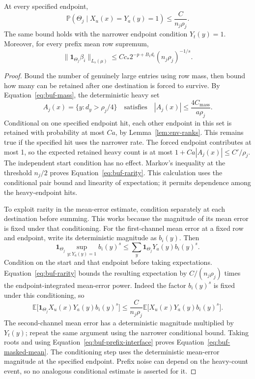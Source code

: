 \begin{lemma}
\label{lem:buf-rarity}
At every specified endpoint,
\begin{equation}
 \mathbb P(\Theta_j\mid X_u(x)=Y_a(y)=1)
      \leq\frac{C}{n_j\rho_j}.
 \label{eq:buf-rarity}
\end{equation}
The same bound holds with the narrower endpoint condition $Y_t(y)=1$.
Moreover, for every prefix mean row supremum,
\begin{equation}
 \|\mathbf1_{\Theta_j}\beta_i\|_{L_s(\mu)}
      \leq Cc_*2^{-p+B_1d_i}(n_j\rho_j)^{-1/s}.
 \label{eq:buf-masked-mean}
\end{equation}
\end{lemma}
\begin{proof}
Bound the number of genuinely large entries using row mass, then bound how many can be retained after one destination is forced to survive. By Equation~\eqref{eq:buf-mass}, the deterministic heavy set
\[
 A_j(x)=\{y:d_y>\rho_j/4\}
 \quad\text{satisfies}\quad
 |A_j(x)|\leq\frac{4C_{\mathrm{mass}}}{a\rho_j}.
\]
Conditional on one specified endpoint
hit, each other endpoint in this set is retained with probability at most
$Ca$, by Lemma~\ref{lem:env-ranks}.  This remains true if the
specified hit uses the narrower rate.  The forced endpoint contributes
at most 1, so the expected retained heavy count is at most
$1+Ca|A_j(x)|\leq C'/\rho_j$.
The independent start condition has no effect.  Markov's inequality
at the threshold $n_j/2$ proves Equation~\eqref{eq:buf-rarity}.
This calculation uses the conditional pair bound and linearity of
expectation; it permits dependence among the heavy-endpoint hits.

To exploit rarity in the mean-error estimate, condition separately at each destination before summing. This works because the magnitude of its mean error is fixed under that conditioning. For the first-channel mean error at a fixed row and endpoint, write its
deterministic magnitude as $b_i(y)$.  Then
\[
 \mathbf1_{\Theta_j}\sup_{y:Y_a(y)=1}b_i(y)^s
       \leq\sum_y\mathbf1_{\Theta_j}Y_a(y)b_i(y)^s.
\]
Condition on the start and that endpoint before taking expectations.
Equation~\eqref{eq:buf-rarity} bounds the resulting expectation by
$C/(n_j\rho_j)$ times the endpoint-integrated mean-error power.
Indeed the factor $b_i(y)^s$ is fixed under this conditioning, so
\[
 \mathbb E\bigl[\mathbf1_{\Theta_j}X_u(x)Y_a(y)b_i(y)^s\bigr]
 \leq\frac{C}{n_j\rho_j}
       \mathbb E\bigl[X_u(x)Y_a(y)b_i(y)^s\bigr].
\]
The second-channel mean error has a deterministic magnitude multiplied
by $Y_t(y)$; repeat the same argument using the narrower conditional
bound.  Taking roots and using Equation~\eqref{eq:buf-prefix-interface}
proves Equation~\eqref{eq:buf-masked-mean}.  The conditioning step uses
the deterministic mean-error magnitude at the specified endpoint.
Prefix noise can depend on the heavy-count event, so no analogous
conditional estimate is asserted for it.
\end{proof}

